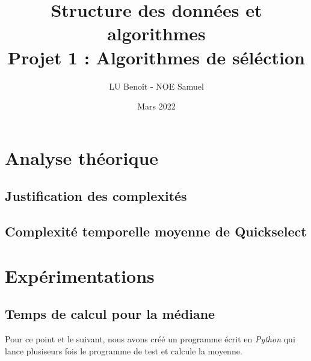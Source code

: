 \documentclass[a4paper, 10pt, oneside]{article}
\title{Structure des données et algorithmes \\ Projet 1 :   Algorithmes de séléction}
\author{LU Benoît - NOE Samuel }
\date{Mars 2022}
\begin{document}
\maketitle

\section{Analyse théorique}
\subsection{Justification des complexités}
\subsection{Complexité temporelle moyenne de Quickselect}

\section{Expérimentations}
\subsection{Temps de calcul pour la médiane}

Pour ce point et le suivant, nous avons créé un programme écrit en \textit{Python} qui lance plusiseurs fois le programme de test et calcule la moyenne.
\end{document}
